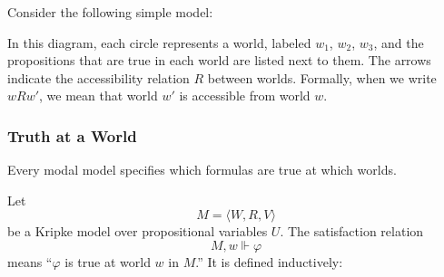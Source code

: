 \documentclass[12pt,a4paper,openany]{article}
\begin{document}
Consider the following simple model:
\begin{center}
\end{center}

In this diagram, each circle represents a world, labeled $w_1$, $w_2$, $w_3$, and the propositions that are true in each world are listed next to them. 
The arrows indicate the accessibility relation $R$ between worlds. Formally, when we write $w R w'$, we mean that world $w'$ is accessible from world $w$.

\subsubsection{Truth at a World}

Every modal model specifies which formulas are true at which worlds.

Let
$$M = \langle W, R, V \rangle$$
be a Kripke model over propositional variables $U$. The satisfaction relation
$$M, w \Vdash \varphi$$
means ``$\varphi$ is true at world $w$ in $M$.'' It is defined inductively:
\end{document}
